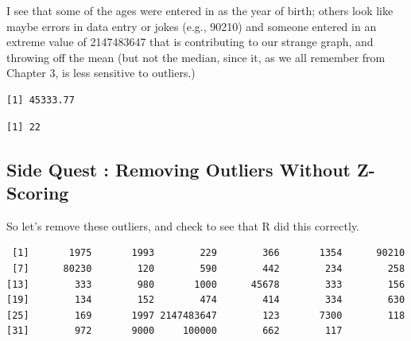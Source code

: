 \documentclass[
  letterpaper,
  DIV=11,
  numbers=noendperiod,
  oneside]{scrreprt}
\newenvironment{Shaded}{\begin{snugshade}}{\end{snugshade}}
\newcommand{\AttributeTok}[1]{\textcolor[rgb]{0.40,0.45,0.13}{#1}}
\newcommand{\CommentTok}[1]{\textcolor[rgb]{0.37,0.37,0.37}{#1}}
\newcommand{\DecValTok}[1]{\textcolor[rgb]{0.68,0.00,0.00}{#1}}
\newcommand{\FunctionTok}[1]{\textcolor[rgb]{0.28,0.35,0.67}{#1}}
\newcommand{\NormalTok}[1]{\textcolor[rgb]{0.00,0.23,0.31}{#1}}
\newcommand{\SpecialCharTok}[1]{\textcolor[rgb]{0.37,0.37,0.37}{#1}}
\begin{document}
I see that some of the ages were entered in as the year of birth; others
look like maybe errors in data entry or jokes (e.g., 90210) and someone
entered in an extreme value of 2147483647 that is contributing to our
strange graph, and throwing off the mean (but not the median, since it,
as we all remember from Chapter 3, is less sensitive to outliers.)

\begin{Shaded}
\end{Shaded}

\begin{verbatim}
[1] 45333.77
\end{verbatim}

\begin{Shaded}
\end{Shaded}

\begin{verbatim}
[1] 22
\end{verbatim}

\subsection{Side Quest : Removing Outliers Without
Z-Scoring}\label{side-quest-removing-outliers-without-z-scoring}

So let's remove these outliers, and check to see that R did this
correctly.

\begin{Shaded}
\end{Shaded}

\begin{verbatim}
 [1]       1975       1993        229        366       1354      90210
 [7]      80230        120        590        442        234        258
[13]        333        980       1000      45678        333        156
[19]        134        152        474        414        334        630
[25]        169       1997 2147483647        123       7300        118
[31]        972       9000     100000        662        117
\end{verbatim}
\end{document}
